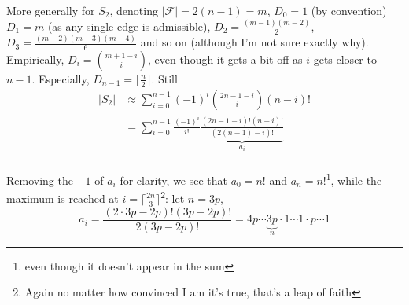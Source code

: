 \documentclass[a4paper,final,notitlepage,11pt,svgnames]{scrartcl}
\newcommand{\inci}{\ensuremath{\mathcal{F}}}
\begin{document}
More generally for $S_2$, denoting $|\inci{}|=2(n-1)=m$, $D_0 = 1$ (by
convention) $D_1 = m$ (as any single edge is admissible), $D_2 =
\frac{(m-1)(m-2)}{2}$, $D_3 = \frac{(m-2)(m-3)(m-4)}{6}$ and so on (although
I'm not sure exactly why). Empirically, $D_i = \binom{m+1-i}{i}$, even though
it gets a bit off as $i$ gets closer to $n-1$. Especially, $D_{n-1} = \lceil
\frac{n}{2} \rceil$. Still
\begin{align*}
	|S_2| & \approx \sum_{i=0}^{n-1} (-1)^i \binom{2n-1-i}{i} (n-i)! \\
       & = \sum_{i=0}^{n-1} \frac{(-1)^i}{i!} \underbrace{\frac{(2n-1-i)!(n-i)!}{(2(n-1)-i)!}}_{a_i} \\
\end{align*}

Removing the $-1$ of $a_i$ for clarity, we see that $a_0 = n!$ and $a_n =
n!$\footnote{even though it doesn't appear in the sum}, while the maximum is
reached at $i=\lceil \frac{2n}{3} \rceil$\footnote{Again no matter how
convinced I am it's true, that's a leap of faith}: let $n=3p$, \[
	a_i = \frac{(2\cdot3p - 2p)!(3p-2p)!}{2(3p-2p)!} =
	4p\cdots\underbrace{3p}_{n} \cdot 1 \cdots1 \cdot p\cdots 1
\]
\end{document}
